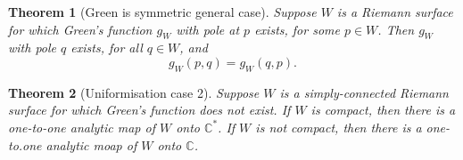 \documentclass[12pt]{article}
\newtheorem{sats}{Theorem}
\theoremstyle{definition}
\newcommand{\C}{\mathbb{C}}    %
\begin{document}
\begin{sats}[Green is symmetric general case]
    Suppose $W$ is a Riemann surface for which Green's function $g_W$ with pole at $p$ exists, for some $p\in W$. Then $g_W$ with pole $q$ exists, for all $q\in W$, and 
    \begin{equation*}
        g_W(p,q)=g_W(q,p).
    \end{equation*}
\end{sats}

\begin{sats}[Uniformisation case 2]
    Suppose $W$ is a simply-connected Riemann surface for which Green's function does not exist. If $W$ is compact, then there is a one-to-one analytic map of $W$ onto $\C^*$. If $W$ is not compact, then there is a one-to.one analytic moap of $W$ onto $\C$.
\end{sats}
\end{document}
